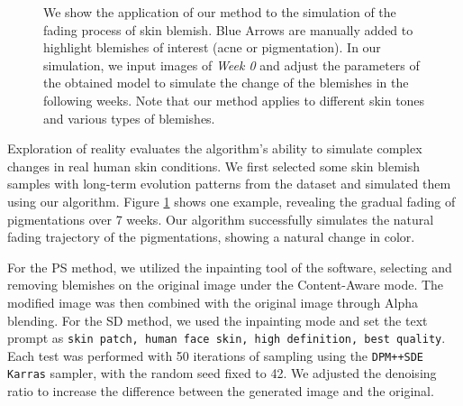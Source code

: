 \begin{spacing}{1.5}
\begin{figure}[t!]
    \caption{We show the application of our method to the simulation of the fading process of skin blemish. Blue Arrows are manually added to highlight blemishes of interest (acne or pigmentation). In our simulation, we input images of \textit{Week 0} and adjust the parameters of the obtained model to simulate the change of the blemishes in the following weeks. Note that our method applies to different skin tones and various types of blemishes.}
    \label{fig:forward}
\end{figure}
Exploration of reality evaluates the algorithm's ability to simulate complex changes in real human skin conditions. We first selected some skin blemish samples with long-term evolution patterns from the dataset and simulated them using our algorithm. Figure \ref{fig:forward} shows one example, revealing the gradual fading of pigmentations over 7 weeks. Our algorithm successfully simulates the natural fading trajectory of the pigmentations, showing a natural change in color.

For the PS method, we utilized the inpainting tool of the software, selecting and removing blemishes on the original image under the Content-Aware mode. The modified image was then combined with the original image through Alpha blending. For the SD method, we used the inpainting mode and set the text prompt as \texttt{skin patch, human face skin, high definition, best quality}. Each test was performed with 50 iterations of sampling using the \texttt{DPM++SDE Karras} sampler, with the random seed fixed to 42. We adjusted the denoising ratio to increase the difference between the generated image and the original.


\end{spacing}
